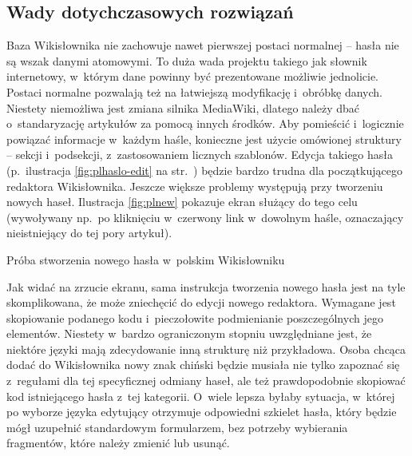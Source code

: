 \documentclass{pracamgr}
\begin{document}
\subsection{Wady dotychczasowych rozwiązań}
Baza Wikisłownika nie zachowuje nawet pierwszej postaci normalnej \cite{book:introduction} -- hasła nie są wszak danymi atomowymi. To duża wada projektu takiego jak słownik internetowy, w~którym dane powinny być prezentowane możliwie jednolicie. Postaci normalne pozwalają też na łatwiejszą modyfikację i~obróbkę danych. Niestety niemożliwa jest zmiana silnika MediaWiki, dlatego należy dbać o~standaryzację artykułów za pomocą innych środków. Aby pomieścić i~logicznie powiązać informacje w~każdym haśle, konieczne jest użycie omówionej struktury -- sekcji i~podsekcji, z~zastosowaniem licznych szablonów. Edycja takiego hasła (p.\ ilustracja \ref{fig:plhaslo-edit} na str.\ \pageref{fig:plhaslo-edit}) będzie bardzo trudna dla początkującego redaktora Wikisłownika. Jeszcze większe problemy występują przy tworzeniu nowych haseł. Ilustracja \ref{fig:plnew} pokazuje ekran służący do tego celu (wywoływany np.\ po kliknięciu w~czerwony link w~dowolnym haśle, oznaczający nieistniejący do tej pory artykuł).

\begin{illustration}
	\caption{Próba stworzenia nowego hasła w~polskim Wikisłowniku}
	\label{fig:plnew}
\end{illustration}

Jak widać na zrzucie ekranu, sama instrukcja tworzenia nowego hasła jest na tyle skomplikowana, że może zniechęcić do edycji nowego redaktora. Wymagane jest skopiowanie podanego kodu i~pieczołowite podmienianie poszczególnych jego elementów. Niestety w~bardzo ograniczonym stopniu uwzględniane jest, że niektóre języki mają zdecydowanie inną strukturę niż przykładowa. Osoba chcąca dodać do Wikisłownika nowy znak chiński będzie musiała nie tylko zapoznać się z~regułami dla tej specyficznej odmiany haseł, ale też prawdopodobnie skopiować kod istniejącego hasła z~tej kategorii. O~wiele lepsza byłaby sytuacja, w~której po wyborze języka edytujący otrzymuje odpowiedni szkielet hasła, który będzie mógł uzupełnić standardowym formularzem, bez potrzeby wybierania fragmentów, które należy zmienić lub usunąć.
\end{document}
